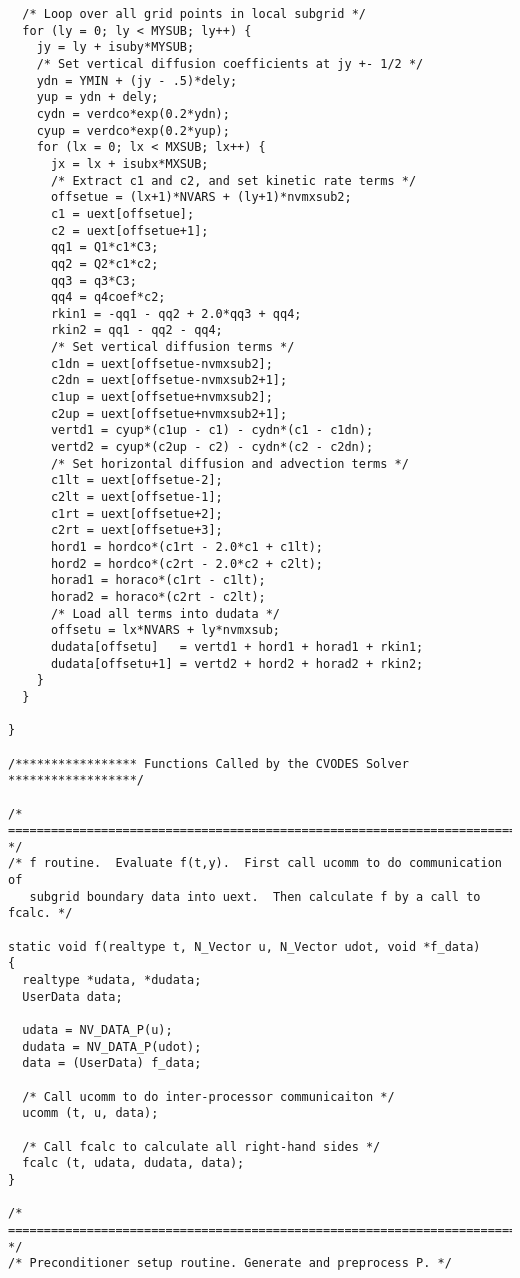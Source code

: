 \begin{verbatim}
  /* Loop over all grid points in local subgrid */
  for (ly = 0; ly < MYSUB; ly++) {
    jy = ly + isuby*MYSUB;
    /* Set vertical diffusion coefficients at jy +- 1/2 */
    ydn = YMIN + (jy - .5)*dely;
    yup = ydn + dely;
    cydn = verdco*exp(0.2*ydn);
    cyup = verdco*exp(0.2*yup);
    for (lx = 0; lx < MXSUB; lx++) {
      jx = lx + isubx*MXSUB;
      /* Extract c1 and c2, and set kinetic rate terms */
      offsetue = (lx+1)*NVARS + (ly+1)*nvmxsub2;
      c1 = uext[offsetue];
      c2 = uext[offsetue+1];
      qq1 = Q1*c1*C3;
      qq2 = Q2*c1*c2;
      qq3 = q3*C3;
      qq4 = q4coef*c2;
      rkin1 = -qq1 - qq2 + 2.0*qq3 + qq4;
      rkin2 = qq1 - qq2 - qq4;
      /* Set vertical diffusion terms */
      c1dn = uext[offsetue-nvmxsub2];
      c2dn = uext[offsetue-nvmxsub2+1];
      c1up = uext[offsetue+nvmxsub2];
      c2up = uext[offsetue+nvmxsub2+1];
      vertd1 = cyup*(c1up - c1) - cydn*(c1 - c1dn);
      vertd2 = cyup*(c2up - c2) - cydn*(c2 - c2dn);
      /* Set horizontal diffusion and advection terms */
      c1lt = uext[offsetue-2];
      c2lt = uext[offsetue-1];
      c1rt = uext[offsetue+2];
      c2rt = uext[offsetue+3];
      hord1 = hordco*(c1rt - 2.0*c1 + c1lt);
      hord2 = hordco*(c2rt - 2.0*c2 + c2lt);
      horad1 = horaco*(c1rt - c1lt);
      horad2 = horaco*(c2rt - c2lt);
      /* Load all terms into dudata */
      offsetu = lx*NVARS + ly*nvmxsub;
      dudata[offsetu]   = vertd1 + hord1 + horad1 + rkin1; 
      dudata[offsetu+1] = vertd2 + hord2 + horad2 + rkin2;
    }
  }

}

/***************** Functions Called by the CVODES Solver ******************/

/* ======================================================================= */
/* f routine.  Evaluate f(t,y).  First call ucomm to do communication of 
   subgrid boundary data into uext.  Then calculate f by a call to fcalc. */

static void f(realtype t, N_Vector u, N_Vector udot, void *f_data)
{
  realtype *udata, *dudata;
  UserData data;

  udata = NV_DATA_P(u);
  dudata = NV_DATA_P(udot);
  data = (UserData) f_data;

  /* Call ucomm to do inter-processor communicaiton */
  ucomm (t, u, data);

  /* Call fcalc to calculate all right-hand sides */
  fcalc (t, udata, dudata, data);
}

/* ======================================================================= */
/* Preconditioner setup routine. Generate and preprocess P. */


\end{verbatim}

